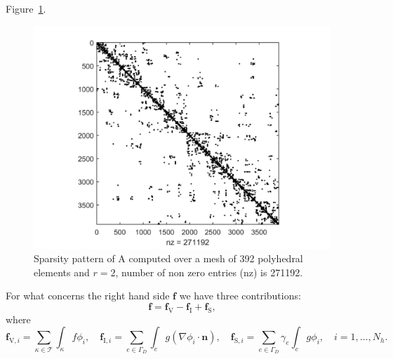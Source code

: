 \documentclass[12pt, a4paper]{article}
\theoremstyle{definition}
\theoremstyle{plain}
\theoremstyle{plain}
\theoremstyle{definition}
\begin{document}
Figure~\ref{fig:spy}.
\begin{figure}[h] 
	\centering
	\includegraphics[scale=0.8]{spy_A}
	\caption{Sparsity pattern of $\mathrm{A}$ computed over a mesh of 392 
	polyhedral elements and $r=2$, number of non zero entries (nz) is 271192.}
	\label{fig:spy}
\end{figure}
\newline
For what concerns the right hand side $\mathbf{f}$ we have three contributions:
\begin{equation*}
\mathbf{f} = \mathbf{f}_\mathrm{V} - \mathbf{f}_\mathrm{I} + \mathbf{f}_\mathrm{S},
\end{equation*}
where
\begin{equation*}
	\mathbf{f}_{\mathrm{V}, i} = \sum_{\kappa \in \mathcal{T}} \int_\kappa f \phi_i, \quad
	\mathbf{f}_{\mathrm{I}, i} = \sum_{e \in \Gamma_D} \int_e g (\nabla \phi_i \cdot \mathbf{n}), \quad
	\mathbf{f}_{\mathrm{S}, i} = \sum_{e \in \Gamma_D} \gamma_e \int_e g \phi_i,
	\quad i = 1,\dots,N_h.
\end{equation*}
\end{document}
